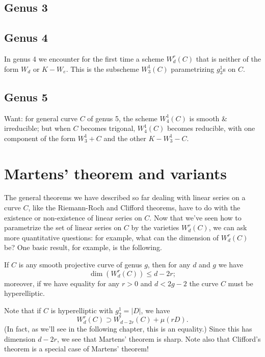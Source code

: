 \subsection{Genus 3}


\subsection{Genus 4}

In genus 4 we encounter for the first time a scheme $W^r_d(C)$ that is neither of the form $W_d$ or $K - W_e$. This is the subscheme $W^1_3(C)$ parametrizing $g^1_3$s on $C$.

\subsection{Genus 5}

Want: for general curve $C$ of genus 5, the scheme $W^1_4(C)$ is smooth \& irreducible; but when $C$ becomes trigonal, $W^1_4(C)$ becomes reducible, with one component of the form $W^1_3 + C$ and the other $K - W^1_3 - C$.

\section{Martens' theorem and variants}

The general theorems we have described so far dealing with linear series on a curve $C$, like the Riemann-Roch and Clifford theorems, have to do with the existence or non-existence of linear series on $C$. Now that we've seen how to parametrize the set of linear series on $C$ by the varieties $W^r_d(C)$, we can ask more quantitative questions: for example, what can the dimension of $W^r_d(C)$ be? One basic result, for example, is the following.

\begin{theorem}
If $C$ is any smooth projective curve of genus $g$, then for any $d$ and $g$ we have
$$
\dim(W^r_d(C)) \leq d-2r;
$$
moreover, if we have equality for any $r > 0$ and $d < 2g-2$ the curve $C$ must be hyperelliptic.
\end{theorem}

Note that if $C$ is hyperelliptic with $g^1_2 = |D|$, we have
$$
W^r_d(C) \supset W_{d-2r}(C) + \mu(rD).
$$
(In fact, as we'll see in the following chapter, this is an equality.) Since this has dimension $d-2r$, we see that Martens' theorem is sharp. Note also that Clifford's theorem is a special case of Martens' theorem!

